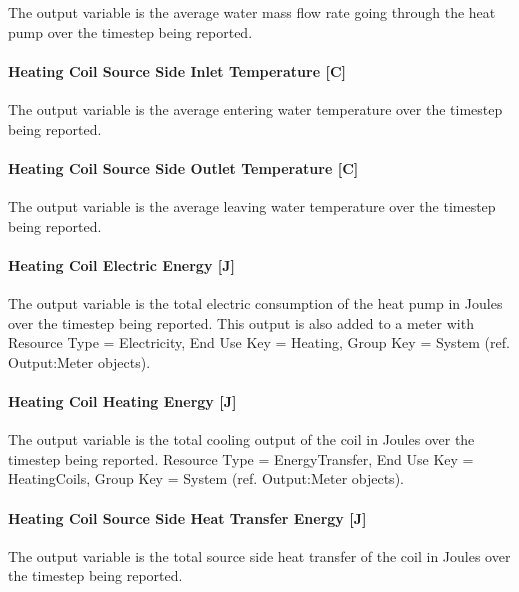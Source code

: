 The output variable is the average water mass flow rate going through the heat pump over the timestep being reported.

\paragraph{Heating Coil Source Side Inlet Temperature {[}C{]}}\label{heating-coil-source-side-inlet-temperature-c}

The output variable is the average entering water temperature over the timestep being reported.

\paragraph{Heating Coil Source Side Outlet Temperature {[}C{]}}\label{heating-coil-source-side-outlet-temperature-c}

The output variable is the average leaving water temperature over the timestep being reported.

\paragraph{Heating Coil Electric Energy {[}J{]}}\label{heating-coil-electric-energy-j-5}

The output variable is the total electric consumption of the heat pump in Joules over the timestep being reported. This output is also added to a meter with Resource Type = Electricity, End Use Key = Heating, Group Key = System (ref. Output:Meter objects).

\paragraph{Heating Coil Heating Energy {[}J{]}}\label{heating-coil-heating-energy-j-3}

The output variable is the total cooling output of the coil in Joules over the timestep being reported. Resource Type = EnergyTransfer, End Use Key = HeatingCoils, Group Key = System (ref. Output:Meter objects).

\paragraph{Heating Coil Source Side Heat Transfer Energy {[}J{]}}\label{heating-coil-source-side-heat-transfer-energy-j-2}

The output variable is the total source side heat transfer of the coil in Joules over the timestep being reported.

